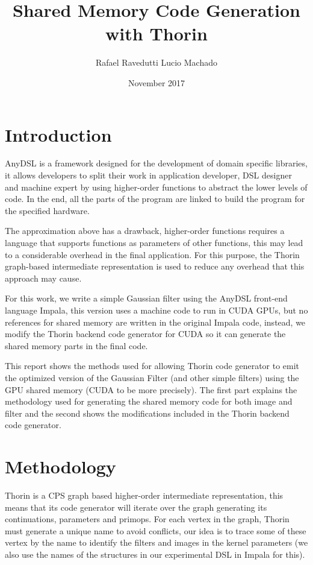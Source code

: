 \documentclass{article}
\title{Shared Memory Code Generation with Thorin}
\author{Rafael Ravedutti Lucio Machado }
\date{November 2017}
\begin{document}
\maketitle

\clearpage

\tableofcontents

\clearpage

\section{Introduction}
AnyDSL \cite{anydsl} is a framework designed for the development of domain specific libraries, it allows developers to split their work in application developer, DSL designer and machine expert by using higher-order functions to abstract the lower levels of code. In the end, all the parts of the program are linked to build the program for the specified hardware.

The approximation above has a drawback, higher-order functions requires a language that supports functions as parameters of other functions, this may lead to a considerable overhead in the final application. For this purpose, the Thorin graph-based intermediate representation is used to reduce any overhead that this approach may cause.

For this work, we write a simple Gaussian filter using the AnyDSL front-end language Impala, this version uses a machine code to run in CUDA GPUs, but no references for shared memory are written in the original Impala code, instead, we modify the Thorin backend code generator for CUDA so it can generate the shared memory parts in the final code.

This report shows the methods used for allowing Thorin code generator to emit the optimized version of the Gaussian Filter (and other simple filters) using the GPU shared memory (CUDA to be more precisely). The first part explains the methodology used for generating the shared memory code for both image and filter and the second shows the modifications included in the Thorin backend code generator.

\section{Methodology}
Thorin is a CPS graph based higher-order intermediate representation, this means that its code generator will iterate over the graph generating its continuations, parameters and primops. For each vertex in the graph, Thorin must generate a unique name to avoid conflicts, our idea is to trace some of these vertex by the name to identify the filters and images in the kernel parameters (we also use the names of the structures in our experimental DSL in Impala for this).
\end{document}
